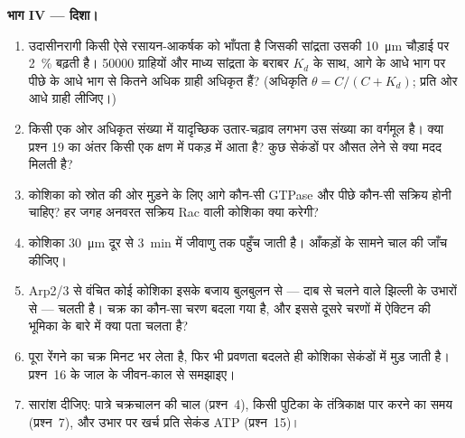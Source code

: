 \begin{problem}
\medskip
\noindent\textbf{भाग IV --- दिशा।}
\begin{enumerate}[resume]
  \item उदासीनरागी किसी ऐसे रसायन-आकर्षक को भाँपता है जिसकी सांद्रता
        उसकी \qty{10}{\micro m} चौड़ाई पर \qty{2}{\%} बढ़ती है।
        \num{50000} ग्राहियों और माध्य सांद्रता के बराबर $K_{d}$ के
        साथ, आगे के आधे भाग पर पीछे के आधे भाग से कितने अधिक ग्राही
        अधिकृत हैं? (अधिकृति $\theta = C/(C +
        K_{d})$; प्रति ओर आधे ग्राही लीजिए।)
  \item किसी एक ओर अधिकृत संख्या में यादृच्छिक उतार-चढ़ाव लगभग उस संख्या
        का वर्गमूल है। क्या प्रश्न 19 का अंतर किसी एक क्षण में पकड़ में
        आता है? कुछ सेकंडों पर औसत लेने से क्या मदद मिलती है?
  \item कोशिका को स्रोत की ओर मुड़ने के लिए आगे कौन-सी GTPase और पीछे
        कौन-सी सक्रिय होनी चाहिए? हर जगह अनवरत सक्रिय Rac वाली कोशिका
        क्या करेगी?
  \item कोशिका \qty{30}{\micro m} दूर से \qty{3}{min} में जीवाणु तक
        पहुँच जाती है। आँकड़ों के सामने चाल की जाँच कीजिए।
  \item Arp2/3 से वंचित कोई कोशिका इसके बजाय बुलबुलन से --- दाब से
        चलने वाले झिल्ली के उभारों से --- चलती है। चक्र का कौन-सा चरण
        बदला गया है, और इससे दूसरे चरणों में ऐक्टिन की भूमिका के बारे
        में क्या पता चलता है?
  \item पूरा रेंगने का चक्र मिनट भर लेता है, फिर भी प्रवणता बदलते ही
        कोशिका सेकंडों में मुड़ जाती है। प्रश्न~16 के जाल के जीवन-काल
        से समझाइए।
  \item सारांश दीजिए: पात्रे चक्रचालन की चाल (प्रश्न~4), किसी पुटिका
        के तंत्रिकाक्ष पार करने का समय (प्रश्न~7), और उभार पर खर्च
        प्रति सेकंड ATP (प्रश्न~15)।
\end{enumerate}
\end{problem}

